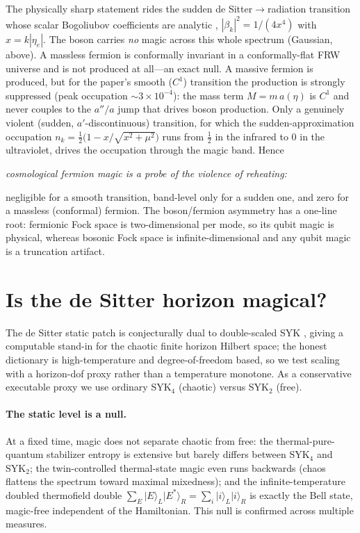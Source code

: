 \documentclass[11pt]{article}
\newcommand{\ket}[1]{\lvert #1 \rangle}
\begin{document}
The physically sharp statement rides the sudden de Sitter$\to$radiation
transition whose scalar Bogoliubov coefficients are analytic
\citep{byun_dsrad}, $|\beta_k|^2=1/(4x^4)$ with $x=k|\eta_e|$. The boson
carries \emph{no} magic across this whole spectrum (Gaussian, above). A
massless fermion is conformally invariant in a conformally-flat FRW universe
and is not produced at all---an exact null. A massive fermion is produced,
but for the paper's smooth ($C^1$) transition the production is strongly
suppressed (peak occupation $\sim3\times10^{-4}$): the mass term $M=m\,a(\eta)$
is $C^1$ and never couples to the $a''/a$ jump that drives boson production.
Only a genuinely violent (sudden, $a'$-discontinuous) transition, for which
the sudden-approximation occupation
$n_k=\tfrac12\big(1-x/\sqrt{x^2+\mu^2}\big)$ runs from $\tfrac12$ in the
infrared to $0$ in the ultraviolet, drives the occupation through the magic
band. Hence
\begin{center}
\emph{cosmological fermion magic is a probe of the violence of reheating:}
\end{center}
negligible for a smooth transition, band-level only for a sudden one, and
zero for a massless (conformal) fermion. The boson/fermion asymmetry has a
one-line root: fermionic Fock space is two-dimensional per mode, so its
qubit magic is physical, whereas bosonic Fock space is infinite-dimensional
and any qubit magic is a truncation artifact.

\section{Is the de Sitter horizon magical?}
\label{sec:p2}

The de Sitter static patch is conjecturally dual to double-scaled SYK
\citep{dsjt_dssyk,doubled_dssyk}, giving a computable stand-in for the
chaotic finite horizon Hilbert space; the honest dictionary is
high-temperature and degree-of-freedom based, so we test scaling with a
horizon-dof proxy rather than a temperature monotone. As a conservative
executable proxy we use ordinary SYK$_4$ (chaotic) versus SYK$_2$ (free).

\paragraph{The static level is a null.} At a fixed time, magic does not
separate chaotic from free: the thermal-pure-quantum stabilizer entropy is
extensive but barely differs between SYK$_4$ and SYK$_2$; the twin-controlled
thermal-state magic even runs backwards (chaos flattens the spectrum toward
maximal mixedness); and the infinite-temperature doubled thermofield double
$\sum_E\ket{E}_L\ket{E^*}_R=\sum_i\ket{i}_L\ket{i}_R$ is exactly the Bell
state, magic-free independent of the Hamiltonian. This null is confirmed
across multiple measures.
\end{document}
